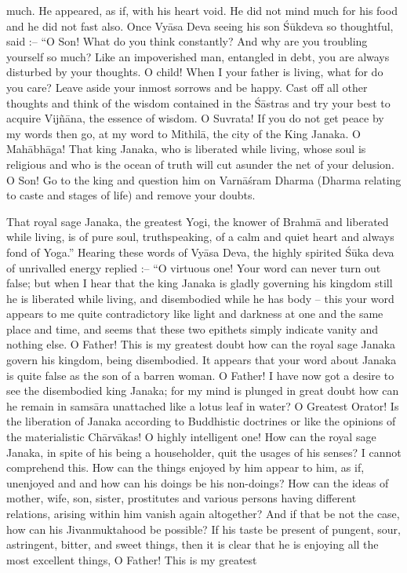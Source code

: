much. He appeared, as if, with his heart void. He did not mind much for his food and he did not fast also. Once Vy\=asa Deva seeing his son \'S\=ukdeva so thoughtful, said :-- ``O Son! What do you think constantly? And why are you troubling yourself so much? Like an impoverished man, entangled in debt, you are always disturbed by your thoughts. O child! When I your father is living, what for do you care? Leave aside your inmost sorrows and be happy. Cast off all other thoughts and think of the wisdom contained in the \'S\=astras and try your best to acquire Vij\~n\=ana, the essence of wisdom. O Suvrata! If you do not get peace by my words then go, at my word to Mithil\=a, the city of the King Janaka. O Mah\=abh\=aga! That king Janaka, who is liberated while living, whose soul is religious and who is the ocean of truth will cut asunder the net of your delusion. O Son! Go to the king and question him on Varn\=a\'sram Dharma (Dharma relating to caste and stages of life) and remove your doubts.

That royal sage Janaka, the greatest Yogi, the knower of Brahm\=a and liberated while living, is of pure soul, truthspeaking, of a calm and quiet heart and always fond of Yoga.'' Hearing these words of Vy\=asa Deva, the highly spirited \'S\=uka deva of unrivalled energy replied :-- ``O virtuous one! Your word can never turn out false; but when I hear that the king Janaka is gladly governing his kingdom still he is liberated while living, and disembodied while he has body -- this your word appears to me quite contradictory like light and darkness at one and the same place and time, and seems that these two epithets simply indicate vanity and nothing else. O Father! This is my greatest doubt how can the royal sage Janaka govern his kingdom, being disembodied. It appears that your word about Janaka is quite false as the son of a barren woman. O Father! I have now got a desire to see the disembodied king Janaka; for my mind is plunged in great doubt how can he remain in sams\=ara unattached like a lotus leaf in water? O Greatest Orator! Is the liberation of Janaka according to Buddhistic doctrines or like the opinions of the materialistic Ch\=arv\=akas! O highly intelligent one! How can the royal sage Janaka, in spite of his being a householder, quit the usages of his senses? I cannot comprehend this. How can the things enjoyed by him appear to him, as if, unenjoyed and and how can his doings be his non-doings? How can the ideas of mother, wife, son, sister, prostitutes and various persons having different relations, arising within him vanish again altogether? And if that be not the case, how can his Jivanmuktahood be possible? If his taste be present of pungent, sour, astringent, bitter, and sweet things, then it is clear that he is enjoying all the most excellent things, O Father! This is my greatest

